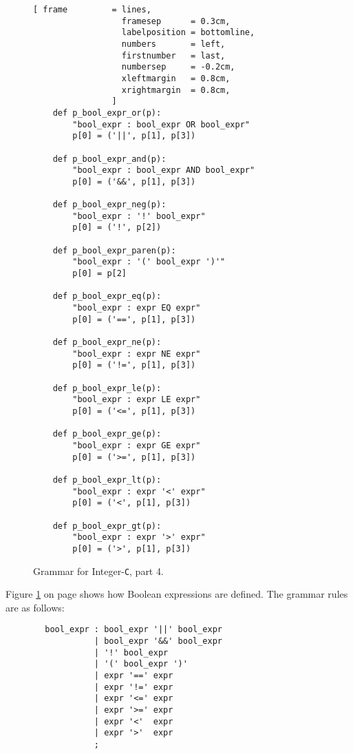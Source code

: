 \begin{figure}[!ht]
\centering
\begin{Verbatim}[ frame         = lines, 
                  framesep      = 0.3cm, 
                  labelposition = bottomline,
                  numbers       = left,
                  firstnumber   = last,
                  numbersep     = -0.2cm,
                  xleftmargin   = 0.8cm,
                  xrightmargin  = 0.8cm,
                ]
    def p_bool_expr_or(p):
        "bool_expr : bool_expr OR bool_expr"
        p[0] = ('||', p[1], p[3])
        
    def p_bool_expr_and(p):
        "bool_expr : bool_expr AND bool_expr"
        p[0] = ('&&', p[1], p[3])
    
    def p_bool_expr_neg(p):
        "bool_expr : '!' bool_expr"
        p[0] = ('!', p[2])

    def p_bool_expr_paren(p):
        "bool_expr : '(' bool_expr ')'"
        p[0] = p[2]

    def p_bool_expr_eq(p):
        "bool_expr : expr EQ expr"
        p[0] = ('==', p[1], p[3])
    
    def p_bool_expr_ne(p):
        "bool_expr : expr NE expr"
        p[0] = ('!=', p[1], p[3])
    
    def p_bool_expr_le(p):
        "bool_expr : expr LE expr"
        p[0] = ('<=', p[1], p[3])
        
    def p_bool_expr_ge(p):
        "bool_expr : expr GE expr"
        p[0] = ('>=', p[1], p[3])
        
    def p_bool_expr_lt(p):
        "bool_expr : expr '<' expr"
        p[0] = ('<', p[1], p[3])
    
    def p_bool_expr_gt(p):
        "bool_expr : expr '>' expr"
        p[0] = ('>', p[1], p[3])
\end{Verbatim}
\vspace*{-0.3cm}
\caption{Grammar for Integer-\texttt{C}, part 4.}
\label{fig:Compiler.ipynb-4}
\end{figure}

\noindent
Figure \ref{fig:Compiler.ipynb-4} on page \pageref{fig:Compiler.ipynb-4} shows how Boolean expressions are
defined.  The grammar rules are as follows:

\begin{verbatim}
        bool_expr : bool_expr '||' bool_expr
                  | bool_expr '&&' bool_expr
                  | '!' bool_expr
                  | '(' bool_expr ')'
                  | expr '==' expr
                  | expr '!=' expr
                  | expr '<=' expr
                  | expr '>=' expr
                  | expr '<'  expr
                  | expr '>'  expr
                  ;
\end{verbatim}

